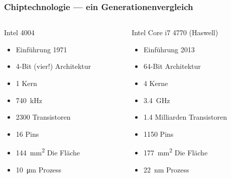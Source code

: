 \begin{frame}
	\frametitle{Chiptechnologie --- ein Generationenvergleich}
	\begin{columns}[t]
		\begin{column}{.45\textwidth}
			\begin{block}{Intel 4004}
				\begin{itemize}
					\item Einführung 1971
					\item 4-Bit (vier!) Architektur
					\item 1 Kern
					\item \SI{740}{\kilo\hertz}
					\item 2300 Transistoren
					\item 16 Pins
					\item \SI{144}{\milli\meter\squared} Die Fläche
					\item \SI{10}{\micro\meter} Prozess
				\end{itemize}
			\end{block}
		\end{column}
		\begin{column}{.55\textwidth}
			\begin{block}{Intel Core i7 4770 (Haswell)}
				\begin{itemize}
					\item Einführung 2013
					\item 64-Bit Architektur
					\item 4 Kerne
					\item \SI{3.4}{\giga\hertz}
					\item 1.4 Milliarden Transistoren
					\item 1150 Pins
					\item \SI{177}{\milli\meter\squared} Die Fläche
					\item \SI{22}{\nano\meter} Prozess
				\end{itemize}
			\end{block}
		\end{column}
	\end{columns}
\end{frame}

